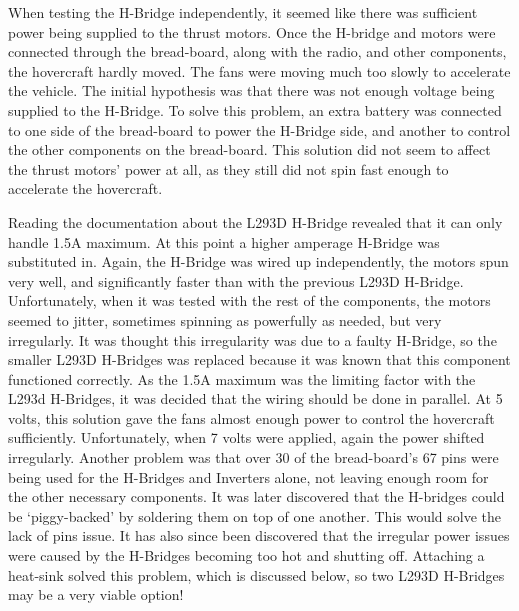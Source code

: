 When testing the H-Bridge independently, it seemed like there was sufficient power being supplied to the thrust motors. Once the H-bridge and motors were connected through the bread-board, along with the radio, and other components, the hovercraft hardly moved. The fans were moving much too slowly to accelerate the vehicle. The initial hypothesis was that there was not enough voltage being supplied to the H-Bridge. To solve this problem, an extra battery was connected to one side of the bread-board to power the H-Bridge side, and another to control the other components on the bread-board. This solution did not seem to affect the thrust motors' power at all, as they still did not spin fast enough to accelerate the hovercraft.

Reading the documentation about the L293D H-Bridge revealed that it can only handle 1.5A maximum. At this point a higher amperage H-Bridge was substituted in. Again, the H-Bridge was wired up independently, the motors spun very well, and significantly faster than with the previous L293D H-Bridge. Unfortunately, when it was tested with the rest of the components, the motors seemed to jitter, sometimes spinning as powerfully as needed, but very irregularly. It was thought this irregularity was due to a faulty H-Bridge, so the smaller L293D H-Bridges was replaced because it was known that this component functioned correctly. As the 1.5A maximum was the limiting factor with the L293d H-Bridges, it was decided that the wiring should be done in parallel. At 5 volts, this solution gave the fans almost enough power to control the hovercraft sufficiently. Unfortunately, when 7 volts were applied, again the power shifted irregularly. Another problem was that over 30 of the bread-board's 67 pins were being used for the H-Bridges and Inverters alone, not leaving enough room for the other necessary components. It was later discovered that the H-bridges could be `piggy-backed' by soldering them on top of one another. This would solve the lack of pins issue. It has also since been discovered that the irregular power issues were caused by the H-Bridges becoming too hot and shutting off. Attaching a heat-sink solved this problem, which is discussed below, so two L293D H-Bridges may be a very viable option!

